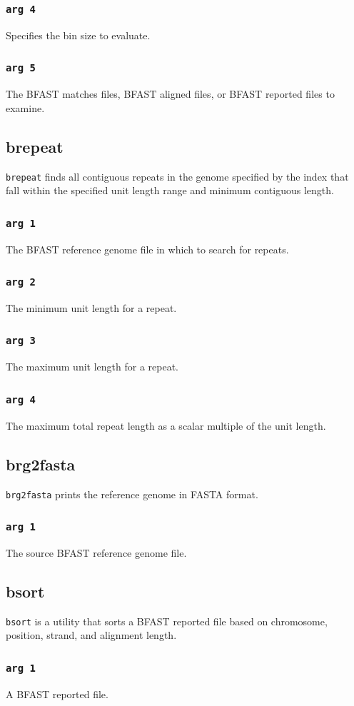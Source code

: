 \documentclass[a4paper,12pt]{book}
\newcommand{\TT}[1]{{\tt #1}} %
\newcommand{\BRGF}{BFAST reference genome file} %
\newcommand{\BMF}{BFAST matches file} %
\newcommand{\BAF}{BFAST aligned file} %
\newcommand{\BRF}{BFAST reported file} %
\begin{document}
\subsubsection{\TT{arg 4}}
Specifies the bin size to evaluate.
\subsubsection{\TT{arg 5}}
The \BMF{s}, \BAF{s}, or \BRF{s} to examine.
\subsection{brepeat}
\label{sec:brepeat}
\TT{brepeat} finds all contiguous repeats in the genome specified by the index that fall within the specified unit length range and minimum contiguous length.
\subsubsection{\TT{arg 1}}
The \BRGF{} in which to search for repeats.
\subsubsection{\TT{arg 2}}
The minimum unit length for a repeat.
\subsubsection{\TT{arg 3}}
The maximum unit length for a repeat.
\subsubsection{\TT{arg 4}}
The maximum total repeat length as a scalar multiple of the unit length.
\subsection{brg2fasta}
\label{sec:brg2fasta}
\TT{brg2fasta} prints the reference genome in FASTA format.
\subsubsection{\TT{arg 1}}
The source \BRGF{}.
\subsection{bsort}
\label{sec:bsort}
\TT{bsort} is a utility that sorts a \BRF{} based on chromosome, position, strand, and alignment length.
\subsubsection{\TT{arg 1}}
A \BRF{}.
\end{document}

